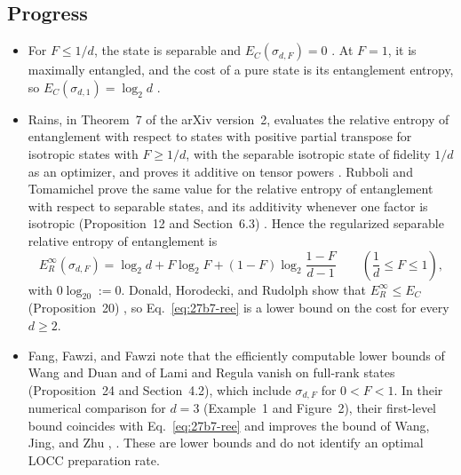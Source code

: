 \subsection*{Progress}

\begin{itemize}
  \item For $F\leq1/d$, the state is separable and $E_C(\sigma_{d,F})=0$
  .  At $F=1$, it is maximally
  entangled, and the cost of a pure state is its entanglement entropy, so
  $E_C(\sigma_{d,1})=\log_2d$
  .

  \item Rains, in Theorem~7 of the arXiv version~2, evaluates the relative
  entropy of entanglement with respect to
  states with positive partial transpose for isotropic states with
  $F\geq1/d$, with the separable isotropic state of fidelity $1/d$ as an
  optimizer, and proves it additive on tensor powers
  .  Rubboli and Tomamichel prove the same
  value for the relative entropy of entanglement with respect to separable
  states, and its additivity whenever one factor is isotropic (Proposition~12
  and Section~6.3) .  Hence the
  regularized separable relative entropy of entanglement is
  \begin{equation}
    E_R^\infty(\sigma_{d,F})
    =\log_2d+F\log_2F+(1-F)\log_2\frac{1-F}{d-1}
    \qquad\left(\frac1d\leq F\leq1\right),
    \label{eq:27b7-ree}
  \end{equation}
  with $0\log_20:=0$.  Donald, Horodecki, and Rudolph show that
  $E_R^\infty\leq E_C$ (Proposition~20)
  , so
  Eq.~\eqref{eq:27b7-ree} is a lower bound on the cost for every $d\geq2$.

  \item Fang, Fawzi, and Fawzi note that the efficiently computable lower bounds
  of Wang and Duan and of Lami and Regula vanish on full-rank states
  (Proposition~24 and Section~4.2), which include $\sigma_{d,F}$ for
  $0<F<1$.  In their numerical comparison for $d=3$ (Example~1 and Figure~2),
  their first-level bound coincides with Eq.~\eqref{eq:27b7-ree} and improves
  the bound of Wang, Jing, and Zhu
  ,
  .  These are lower bounds and do
  not identify an optimal LOCC preparation rate.


\end{itemize}
